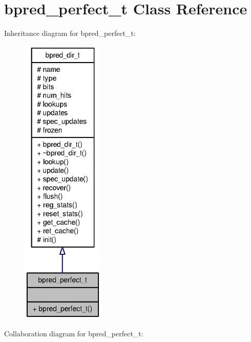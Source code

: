 \section{bpred\_\-perfect\_\-t Class Reference}
\label{classbpred__perfect__t}
Inheritance diagram for bpred\_\-perfect\_\-t:\nopagebreak
\begin{figure}[H]
\begin{center}
\leavevmode
\includegraphics[height=400pt]{classbpred__perfect__t__inherit__graph}
\end{center}
\end{figure}
Collaboration diagram for bpred\_\-perfect\_\-t:\nopagebreak
